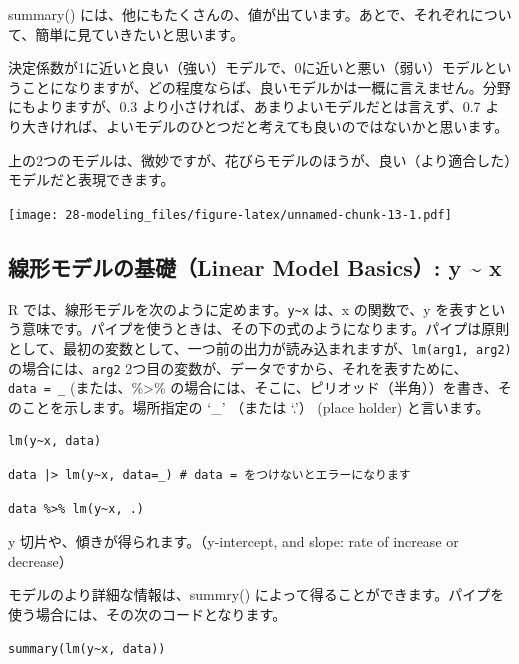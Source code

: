 \documentclass[
  xelatex, ja=standard]{bxjsbook}
\theoremstyle{definition}
\theoremstyle{definition}
\theoremstyle{definition}
\theoremstyle{definition}
\theoremstyle{remark}
\begin{document}
summary() には、他にもたくさんの、値が出ています。あとで、それぞれについて、簡単に見ていきたいと思います。

決定係数が1に近いと良い（強い）モデルで、0に近いと悪い（弱い）モデルということになりますが、どの程度ならば、良いモデルかは一概に言えません。分野にもよりますが、0.3 より小さければ、あまりよいモデルだとは言えず、0.7 より大きければ、よいモデルのひとつだと考えても良いのではないかと思います。

上の2つのモデルは、微妙ですが、花びらモデルのほうが、良い（より適合した）モデルだと表現できます。

\texttt{[image: 28-modeling\_files/figure-latex/unnamed-chunk-13-1.pdf]}

\hypertarget{ux7ddaux5f62ux30e2ux30c7ux30ebux306eux57faux790elinear-model-basics-y-x}{%
\subsection{線形モデルの基礎（Linear Model Basics）: y \textasciitilde{} x}\label{ux7ddaux5f62ux30e2ux30c7ux30ebux306eux57faux790elinear-model-basics-y-x}}

R では、線形モデルを次のように定めます。\texttt{y\textasciitilde{}x} は、x の関数で、y を表すという意味です。パイプを使うときは、その下の式のようになります。パイプは原則として、最初の変数として、一つ前の出力が読み込まれますが、\texttt{lm(arg1,\ arg2)} の場合には、\texttt{arg2} 2つ目の変数が、データですから、それを表すために、\texttt{data\ =\ \_} (または、\%\textgreater\% の場合には、そこに、ピリオッド（半角））を書き、そのことを示します。場所指定の `\_' （または `.'） (place holder) と言います。

\begin{verbatim}
lm(y~x, data)
\end{verbatim}

\begin{verbatim}
data |> lm(y~x, data=_) # data = をつけないとエラーになります
\end{verbatim}

\begin{verbatim}
data %>% lm(y~x, .)
\end{verbatim}

y 切片や、傾きが得られます。（y-intercept, and slope: rate of increase or decrease）

モデルのより詳細な情報は、summry() によって得ることができます。パイプを使う場合には、その次のコードとなります。

\begin{verbatim}
summary(lm(y~x, data))
\end{verbatim}
\end{document}
